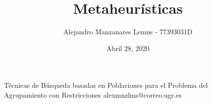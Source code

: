 \documentclass[10pt]{report}
\author{Alejandro Manzanares Lemus - 77393031D}
\title{Metaheurísticas}
\date{Abril 28, 2020}
\begin{document}
				{Técnicas de Búsqueda basadas en Poblaciones para el Problema del Agrupamiento con Restricciones}
            {alexmnzlms@correo.ugr.es}

\tableofcontents

% 
% 
% 
% 
% 












\end{document}
